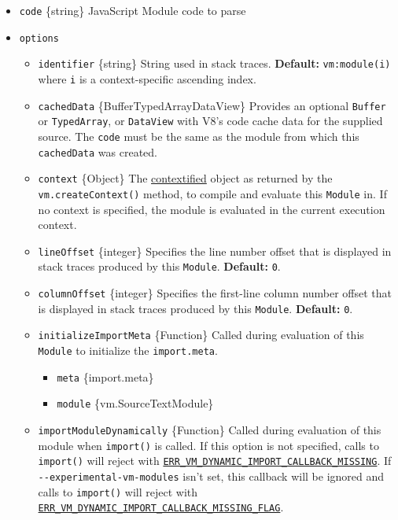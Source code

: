 \begin{itemize}
\tightlist
\item
  \texttt{code} \{string\} JavaScript Module code to parse
\item
  \texttt{options}

  \begin{itemize}
  \tightlist
  \item
    \texttt{identifier} \{string\} String used in stack traces.
    \textbf{Default:}
    \texttt{\textquotesingle{}vm:module(i)\textquotesingle{}} where
    \texttt{i} is a context-specific ascending index.
  \item
    \texttt{cachedData} \{Buffer\textbar TypedArray\textbar DataView\}
    Provides an optional \texttt{Buffer} or \texttt{TypedArray}, or
    \texttt{DataView} with V8's code cache data for the supplied source.
    The \texttt{code} must be the same as the module from which this
    \texttt{cachedData} was created.
  \item
    \texttt{context} \{Object\} The
    \hyperref[what-does-it-mean-to-contextify-an-object]{contextified}
    object as returned by the \texttt{vm.createContext()} method, to
    compile and evaluate this \texttt{Module} in. If no context is
    specified, the module is evaluated in the current execution context.
  \item
    \texttt{lineOffset} \{integer\} Specifies the line number offset
    that is displayed in stack traces produced by this \texttt{Module}.
    \textbf{Default:} \texttt{0}.
  \item
    \texttt{columnOffset} \{integer\} Specifies the first-line column
    number offset that is displayed in stack traces produced by this
    \texttt{Module}. \textbf{Default:} \texttt{0}.
  \item
    \texttt{initializeImportMeta} \{Function\} Called during evaluation
    of this \texttt{Module} to initialize the \texttt{import.meta}.

    \begin{itemize}
    \tightlist
    \item
      \texttt{meta} \{import.meta\}
    \item
      \texttt{module} \{vm.SourceTextModule\}
    \end{itemize}
  \item
    \texttt{importModuleDynamically} \{Function\} Called during
    evaluation of this module when \texttt{import()} is called. If this
    option is not specified, calls to \texttt{import()} will reject with
    \href{errors.md\#err_vm_dynamic_import_callback_missing}{\texttt{ERR\_VM\_DYNAMIC\_IMPORT\_CALLBACK\_MISSING}}.
    If \texttt{-\/-experimental-vm-modules} isn't set, this callback
    will be ignored and calls to \texttt{import()} will reject with
    \href{errors.md\#err_vm_dynamic_import_callback_missing_flag}{\texttt{ERR\_VM\_DYNAMIC\_IMPORT\_CALLBACK\_MISSING\_FLAG}}.


\end{itemize}
\end{itemize}
